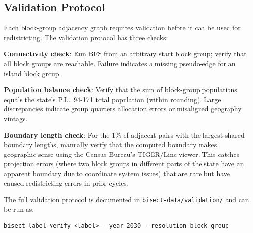 \subsection{Validation Protocol}

Each block-group adjacency graph requires validation before it can be used for
redistricting. The validation protocol has three checks:

\textbf{Connectivity check}: Run BFS from an arbitrary start block group; verify
that all block groups are reachable. Failure indicates a missing pseudo-edge
for an island block group.

\textbf{Population balance check}: Verify that the sum of block-group populations
equals the state's P.L.\ 94-171 total population (within rounding). Large discrepancies
indicate group quarters allocation errors or misaligned geography vintage.

\textbf{Boundary length check}: For the 1\% of adjacent pairs with the largest shared
boundary lengths, manually verify that the computed boundary makes geographic sense
using the Census Bureau's TIGER/Line viewer. This catches projection errors (where
two block groups in different parts of the state have an apparent boundary due to
coordinate system issues) that are rare but have caused redistricting errors in
prior cycles.

The full validation protocol is documented in \texttt{bisect-data/validation/}
and can be run as:

\begin{verbatim}
bisect label-verify <label> --year 2030 --resolution block-group
\end{verbatim}
